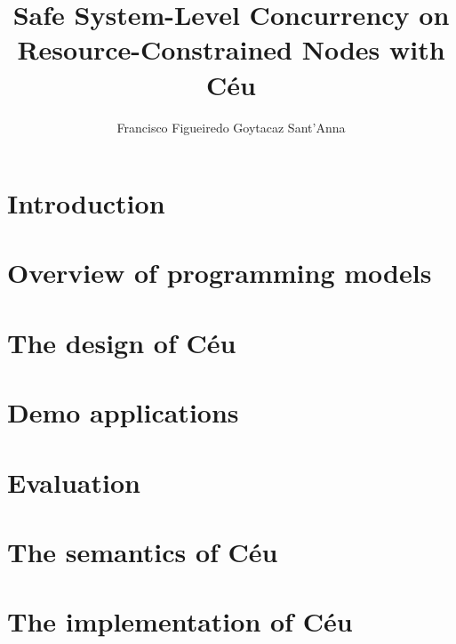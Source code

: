 \documentclass[phd,twoside,british]{ThesisPUC_uk}
\author{Francisco Figueiredo Goytacaz Sant'Anna}
\title{Safe System-Level Concurrency on Resource-Constrained Nodes with C\'eu}
\let\xcleardoublepage\cleardoublepage
\let\cleardoublepage\clearpage
\newcommand{\1}{\;}
\newcommand{\2}{\;\;}
\newcommand{\3}{\;\;\;}
\newcommand{\5}{\;\;\;\;\;}
\begin{document}
\let\cleardoublepage\xcleardoublepage



\chapter{Introduction}
    \label{sec.intro}
    

\chapter{Overview of programming models}
    \label{sec.models}
    

\chapter{The design of C\'eu}
    \label{sec.ceu}
    

\chapter{Demo applications}
    \label{sec.demos}
    

\chapter{Evaluation}
    \label{sec.eval}
    

\chapter{The semantics of C\'eu}
    \label{sec.formal}
    

\chapter{The implementation of C\'eu}
    \label{sec.impl}
    

\end{document}
